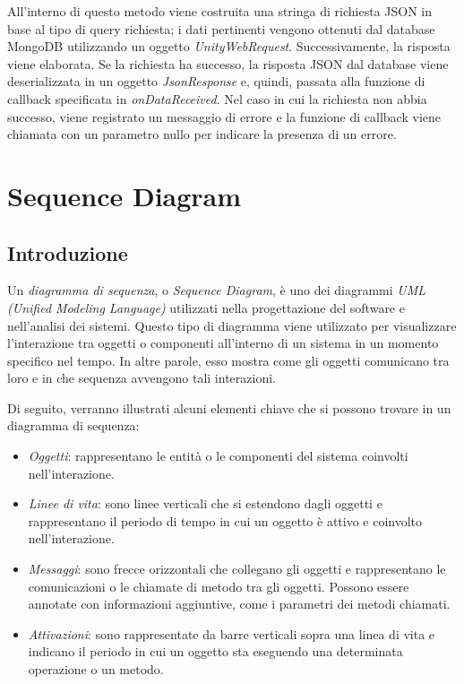 All'interno di questo metodo viene costruita una stringa di richiesta JSON in base al tipo di query richiesta; i dati pertinenti vengono ottenuti dal database MongoDB utilizzando un oggetto \textit{UnityWebRequest}. Successivamente, la risposta viene elaborata. Se la richiesta ha successo, la risposta JSON dal database viene deserializzata in un oggetto \textit{JsonResponse} e, quindi, passata alla funzione di callback specificata in \textit{onDataReceived}. Nel caso in cui la richiesta non abbia successo, viene registrato un messaggio di errore e la funzione di callback viene chiamata con un parametro nullo per indicare la presenza di un errore.

\section{Sequence Diagram}

\subsection{Introduzione}

Un \textit{diagramma di sequenza}, o \textit{Sequence Diagram}, è uno dei diagrammi \textit{UML (Unified Modeling Language)} utilizzati nella progettazione del software e nell'analisi dei sistemi. Questo tipo di diagramma viene utilizzato per visualizzare l'interazione tra oggetti o componenti all'interno di un sistema in un momento specifico nel tempo. In altre parole, esso mostra come gli oggetti comunicano tra loro e in che sequenza avvengono tali interazioni.

Di seguito, verranno illustrati alcuni elementi chiave che si possono trovare in un diagramma di sequenza:

\begin{itemize}
    \item \textit{Oggetti}: rappresentano le entità o le componenti del sistema coinvolti nell'interazione.
    \item \textit{Linee di vita}: sono linee verticali che si estendono dagli oggetti e rappresentano il periodo di tempo in cui un oggetto è attivo e coinvolto nell'interazione.
    \item \textit{Messaggi}: sono frecce orizzontali che collegano gli oggetti e rappresentano le comunicazioni o le chiamate di metodo tra gli oggetti. Possono essere annotate con informazioni aggiuntive, come i parametri dei metodi chiamati.
    \item \textit{Attivazioni}: sono rappresentate da barre verticali sopra una linea di vita e indicano il periodo in cui un oggetto sta eseguendo una determinata operazione o un metodo.
\end{itemize}

